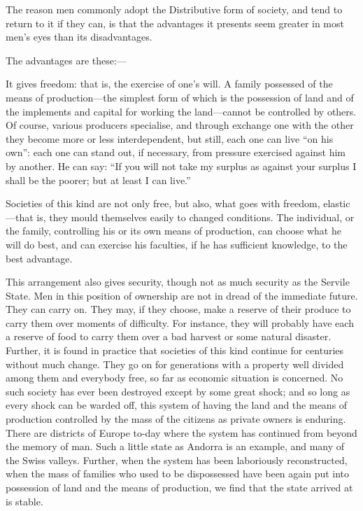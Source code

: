 \documentclass{book}
\begin{document}
The reason men commonly adopt the Distributive form of society, and tend to return to it if they can, is that the advantages it presents seem greater in most men’s eyes than its disadvantages.

The advantages are these:—

It gives freedom: that is, the exercise of one’s will. A family possessed of the means of production—the simplest form of which is the possession of land and of the implements and capital for working the land—cannot be controlled by others. Of course, various producers specialise, and through exchange one with the other they become more or less interdependent, but still, each one can live “on his own”: each one can stand out, if necessary, from pressure exercised against him by another. He can say: “If you will not take my surplus as against your surplus I shall be the poorer; but at least I can live.”

Societies of this kind are not only free, but also, what goes with freedom, elastic—that is, they mould themselves easily to changed conditions. The individual, or the family, controlling his or its own means of production, can choose what he will do best, and can exercise his faculties, if he has sufficient knowledge, to the best advantage.

This arrangement also gives security, though not as much security as the Servile State. Men in this position of ownership are not in dread of the immediate future. They can carry on. They may, if they choose, make a reserve of their produce to carry them over moments of difficulty. For instance, they will probably have each a reserve of food to carry them over a bad harvest or some natural disaster. Further, it is found in practice that societies of this kind continue for centuries without much change. They go on for generations with a property well divided among them and everybody free, so far as economic situation is concerned. No such society has ever been destroyed except by some great shock; and so long as every shock can be warded off, this system of having the land and the means of production controlled by the mass of the citizens as private owners is enduring. There are districts of Europe to-day where the system has continued from beyond the memory of man. Such a little state as Andorra is an example, and many of the Swiss valleys. Further, when the system has been laboriously reconstructed, when the mass of families who used to be dispossessed have been again put into possession of land and the means of production, we find that the state arrived at is stable.
\end{document}
